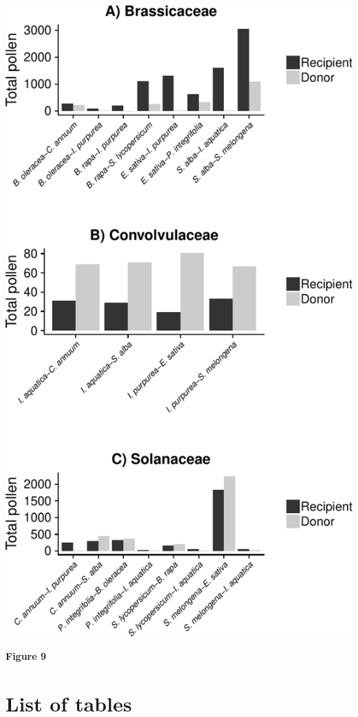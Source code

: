 \documentclass[]{article}
\begin{document}
\begin{center}\includegraphics{output/figures/unnamed-chunk-10-1} \end{center}

\textbf{Figure 9}

\newpage

\section{List of tables}\label{list-of-tables}
\end{document}
